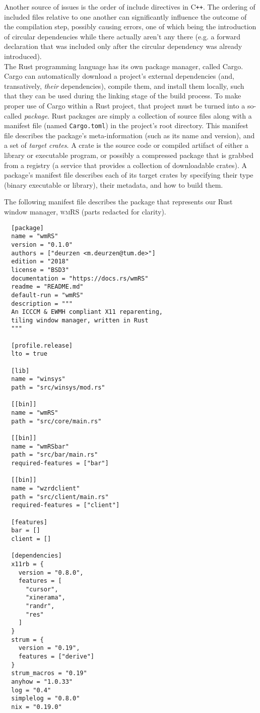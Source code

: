 Another source of issues is the order of include directives in C\texttt{++}. The
ordering of included  files relative to one another  can significantly influence
the outcome of the compilation step, possibly causing errors, one of which being
the introduction of circular dependencies  while there actually aren't any there
(e.g. a forward declaration that was included only after the circular dependency
was already introduced).\\

The Rust programming  language has its own package manager,  called Cargo. Cargo
can automatically download a project's external dependencies (and, transatively,
\textit{their} dependencies), compile them, and  install them locally, such that
they can be used  during the linking stage of the build  process. To make proper
use of Cargo within a Rust project, that project must be turned into a so-called
\textit{package}.  Rust  packages  are  simply  a  collection  of  source  files
along with  a manifest  file (named \texttt{Cargo.toml})  in the  project's root
directory. This manifest file describes  the package's meta-information (such as
its name  and version),  and a  set of  \textit{target crates}.  A crate  is the
source code or  compiled artifact of either a library  or executable program, or
possibly a  compressed package that is  grabbed from a registry  (a service that
provides  a  collection  of  downloadable crates).  A  package's  manifest  file
describes each of its target crates  by specifying their type (binary executable
or library), their metadata, and how to build them.

The  following manifest  file describes  the  package that  represents our  Rust
window manager, \textsc{wmRS} (parts redacted for clarity).\\

\begin{verbatim}
  [package]
  name = "wmRS"
  version = "0.1.0"
  authors = ["deurzen <m.deurzen@tum.de>"]
  edition = "2018"
  license = "BSD3"
  documentation = "https://docs.rs/wmRS"
  readme = "README.md"
  default-run = "wmRS"
  description = """
  An ICCCM & EWMH compliant X11 reparenting,
  tiling window manager, written in Rust
  """
  
  [profile.release]
  lto = true
  
  [lib]
  name = "winsys"
  path = "src/winsys/mod.rs"
  
  [[bin]]
  name = "wmRS"
  path = "src/core/main.rs"
  
  [[bin]]
  name = "wmRSbar"
  path = "src/bar/main.rs"
  required-features = ["bar"]
  
  [[bin]]
  name = "wzrdclient"
  path = "src/client/main.rs"
  required-features = ["client"]
  
  [features]
  bar = []
  client = []
  
  [dependencies]
  x11rb = {
    version = "0.8.0",
    features = [
      "cursor",
      "xinerama",
      "randr",
      "res"
    ]
  }
  strum = {
    version = "0.19",
    features = ["derive"]
  }
  strum_macros = "0.19"
  anyhow = "1.0.33"
  log = "0.4"
  simplelog = "0.8.0"
  nix = "0.19.0"
\end{verbatim}

